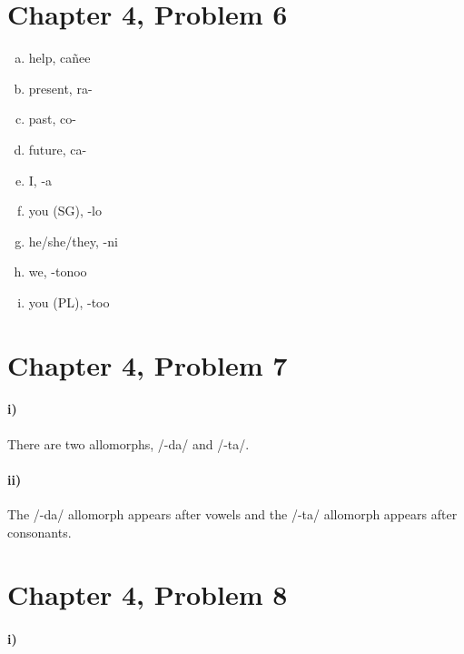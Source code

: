 \documentclass[12pt]{article}
\begin{document}
\section*{Chapter 4, Problem 6}

\begin{multicols}{2}
    \begin{enumerate}[a)]
        \item help, ca\~nee
        \item present, ra-
        \item past, co-
        \item future, ca-
        \item I, -a
        \item you (SG), -lo
        \item he/she/they, -ni
        \item we, -tonoo
        \item you (PL), -too
    \end{enumerate}
\end{multicols}

\section*{Chapter 4, Problem 7}

\paragraph{i)}

There are two allomorphs, /-da/ and /-ta/.

\paragraph{ii)}

The /-da/ allomorph appears after vowels and the /-ta/ allomorph appears after consonants.

\section*{Chapter 4, Problem 8}

\paragraph{i)}
\end{document}
